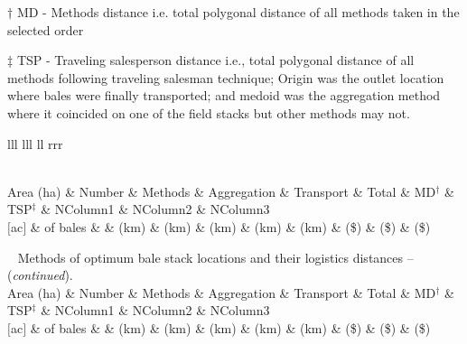 \documentclass[phd,showgrids]{ndsu-thesis-2022}
\newcommand\tabletopinfols{
\toprule
Area (ha) & Number  & Methods & Aggregation & Transport & Total & MD$^\dag$ & TSP$^\ddag$ & NColumn1  &  NColumn2  &  NColumn3 \\
$[$ac$]$ & of bales  &  & (km) & (km) & (km) & (km) & (km) & (\$) & (\$) & (\$) \\
    \midrule 
}
\begin{document}
\vspace{2ex}
\setlength\LTleft{0pt}
\setlength\LTright{0pt}

\begin{landscape}
{\small 
{\renewcommand{\arraystretch}{0.6}
\begin{ThreePartTable}
  \begin{TableNotes}
  \baselineskip
    \item[] $\dag$ MD - Methods distance i.e. total polygonal distance of all methods taken in the selected order    
    \item[] $\ddag$ TSP - Traveling salesperson distance i.e., total polygonal distance of all methods following traveling salesman technique; Origin was the outlet location where bales were finally transported; and medoid was the aggregation method where it coincided on one of the field stacks but other methods may not.
  \end{TableNotes}
  \begin{longtable}{lll lll ll rrr}
  \caption{\normalsize A long table - spanning 3 pages - an example taken from our research group work on ``Methods of optimum bale stack locations and their logistics distances and methods combined distances.''}\label{tab1}\\[-2ex]     
  \tabletopinfols%
    \endfirsthead
    
{{\normalsize\tablename\ \thetable{} Methods of optimum bale stack locations and their logistics distances  -- (\emph{continued}).}} \\[2ex]
 \tabletopinfols%
    \endhead
    
    \endfoot
    \bottomrule
    \insertTableNotes
    \endlastfoot
        

\end{longtable}
\end{ThreePartTable}}}
\end{landscape}
\end{document}
